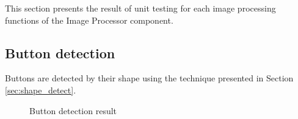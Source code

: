 This section presents the result of unit testing for each image processing functions of the Image Processor component.

\subsection{Button detection}
Buttons are detected by their shape using the technique presented in Section \ref{sec:shape_detect}.

	\begin{figure}[H]
	    \centering
	    

	    \caption{Button detection result}
		\label{fig:btn_detect}
	\end{figure}

